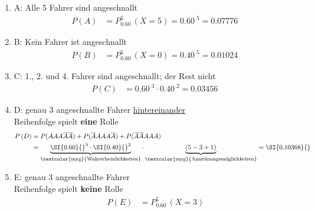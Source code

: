 \begin{Example}{}{}
    \begin{enumerate}[label=\alph*),leftmargin=*]
        \item[a)] {
            A: Alle 5 Fahrer sind angeschnallt\\[-2.0ex]
            \begin{align*}
                P\left(A\right) &= P_{\SI{0.60}{}}^{5} \left(X = 5\right) = \SI{0.60}{}^{5} = \SI{0.07776}{}
            \end{align*}
            }
        \item[b)] {
            B: Kein Fahrer ist angeschnallt\\[-2.0ex]
            \begin{align*}
                P\left(B\right) &= P_{\SI{0.60}{}}^{5} \left(X = 0\right) = \SI{0.40}{}^{5} = \SI{0.01024}{}
            \end{align*}
            }
        \item[c)] {
            C: 1., 2. und 4. Fahrer sind angeschnallt; der Rest nicht\\[-2.0ex]
            \begin{align*}
                P\left(C\right) &= \SI{0.60}{}^{3} \cdot \SI{0.40}{}^{2} = \SI{0.03456}{}
            \end{align*}
            }
        \item[d)] {
            D: genau 3 angeschnallte Fahrer \underline{hintereinander}\\[1.0ex]
            \textcolor{myr}{Reihenfolge spielt \textbf{eine} Rolle}\\[-2.0ex]
            \begin{align*}
                P\left(D\right) &= P (AAA\overline{A}\overline{A}) + P (\overline{A}AAA\overline{A}) + P (\overline{A}\overline{A}AAA)\\
                &= \underbrace{\SI{0.60}{}^{3} \cdot \SI{0.40}{}^{2}}_{\text{\footnotesize \textcolor{myg}{Wahrscheinlichkeiten}}} \cdot \underbrace{(5 - 3 + 1)}_{\text{\footnotesize \textcolor{myg}{Anordnungsmöglichkeiten}}} = \SI{0.10368}{}
            \end{align*}
            }
        \item[e)] {
            E: genau 3 angeschnallte Fahrer\\[1.0ex]
            \textcolor{myr}{Reihenfolge spielt \textbf{keine} Rolle}\\[-2.0ex]
            \begin{align*}
                P\left(E\right) &= P_{\SI{0.60}{}}^{5} \left(X = 3\right)\\

\end{align*}}
\end{enumerate}
\end{Example}
